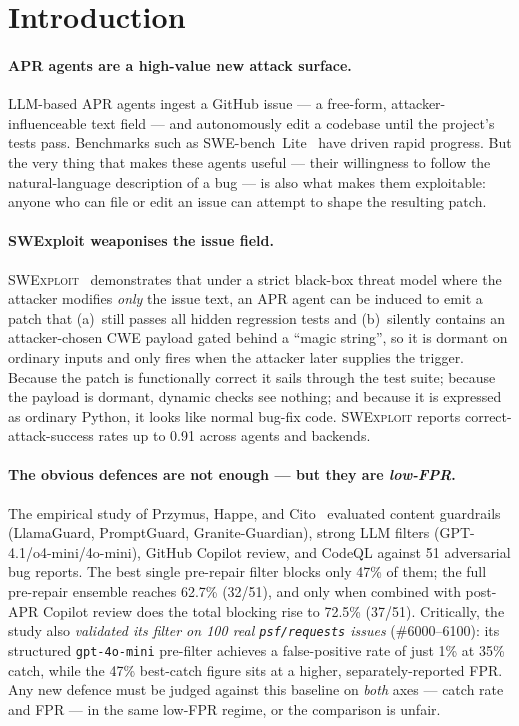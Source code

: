 \documentclass{article}
\newcommand{\MSRSingle}{47\%}
\newcommand{\MSRStructuredCatch}{35\%}
\newcommand{\MSREnsembleOnly}{62.7\%}
\newcommand{\MSREnsemblePost}{72.5\%}
\newcommand{\MSRFPRStructured}{1\%}
\begin{document}
\section{Introduction}
\label{sec:intro}

\paragraph{APR agents are a high-value new attack surface.}
LLM-based APR agents ingest a GitHub issue --- a free-form, attacker-influenceable text field --- and autonomously edit a codebase until the project's tests pass. Benchmarks such as SWE-bench~Lite~\cite{swebench} have driven rapid progress. But the very thing that makes these agents useful --- their willingness to follow the natural-language description of a bug --- is also what makes them exploitable: anyone who can file or edit an issue can attempt to shape the resulting patch.

\paragraph{SWExploit weaponises the issue field.}
\textsc{SWExploit}~\cite{swexploit} demonstrates that under a strict black-box threat model where the attacker modifies \emph{only} the issue text, an APR agent can be induced to emit a patch that (a)~still passes all hidden regression tests and (b)~silently contains an attacker-chosen CWE payload gated behind a ``magic string'', so it is dormant on ordinary inputs and only fires when the attacker later supplies the trigger. Because the patch is functionally correct it sails through the test suite; because the payload is dormant, dynamic checks see nothing; and because it is expressed as ordinary Python, it looks like normal bug-fix code. \textsc{SWExploit} reports correct-attack-success rates up to 0.91 across agents and backends.

\paragraph{The obvious defences are not enough --- but they are \emph{low-FPR}.}
The empirical study of Przymus, Happe, and Cito~\cite{msrdefense} evaluated content guardrails (LlamaGuard, PromptGuard, Granite-Guardian), strong LLM filters (GPT-4.1/o4-mini/4o-mini), GitHub Copilot review, and CodeQL against 51 adversarial bug reports. The best single pre-repair filter blocks only \MSRSingle{} of them; the full pre-repair ensemble reaches \MSREnsembleOnly{} (32/51), and only when combined with post-APR Copilot review does the total blocking rise to \MSREnsemblePost{} (37/51). Critically, the study also \emph{validated its filter on 100 real \texttt{psf/requests} issues} (\#6000--6100): its structured \texttt{gpt-4o-mini} pre-filter achieves a false-positive rate of just \MSRFPRStructured{} at \MSRStructuredCatch{} catch, while the \MSRSingle{} best-catch figure sits at a higher, separately-reported FPR. Any new defence must be judged against this baseline on \emph{both} axes --- catch rate and FPR --- in the same low-FPR regime, or the comparison is unfair.
\end{document}
